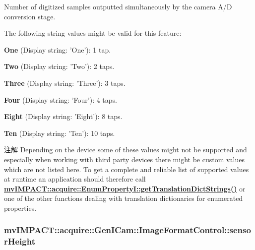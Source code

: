 Number of digitized samples outputted simultaneously by the camera A/\+D conversion stage.

The following string values might be valid for this feature\+:
\begin{DoxyItemize}
\item {\bfseries One} (Display string\+: 'One')\+: 1 tap.
\item {\bfseries Two} (Display string\+: 'Two')\+: 2 taps.
\item {\bfseries Three} (Display string\+: 'Three')\+: 3 taps.
\item {\bfseries Four} (Display string\+: 'Four')\+: 4 taps.
\item {\bfseries Eight} (Display string\+: 'Eight')\+: 8 taps.
\item {\bfseries Ten} (Display string\+: 'Ten')\+: 10 taps.
\end{DoxyItemize}

\begin{DoxyNote}{注解}
Depending on the device some of these values might not be supported and especially when working with third party devices there might be custom values which are not listed here. To get a complete and reliable list of supported values at runtime an application should therefore call {\bfseries \hyperlink{classmv_i_m_p_a_c_t_1_1acquire_1_1_enum_property_i_a0ba6ccbf5ee69784d5d0b537924d26b6}{mv\+I\+M\+P\+A\+C\+T\+::acquire\+::\+Enum\+Property\+I\+::get\+Translation\+Dict\+Strings()}} or one of the other functions dealing with translation dictionaries for enumerated properties. 
\end{DoxyNote}
\hypertarget{classmv_i_m_p_a_c_t_1_1acquire_1_1_gen_i_cam_1_1_image_format_control_af009ab8eff29c63d559ef2b7d01f4385}{
\subsubsection[{sensor\+Height}]{ mv\+I\+M\+P\+A\+C\+T\+::acquire\+::\+Gen\+I\+Cam\+::\+Image\+Format\+Control\+::sensor\+Height}}\label{classmv_i_m_p_a_c_t_1_1acquire_1_1_gen_i_cam_1_1_image_format_control_af009ab8eff29c63d559ef2b7d01f4385}


